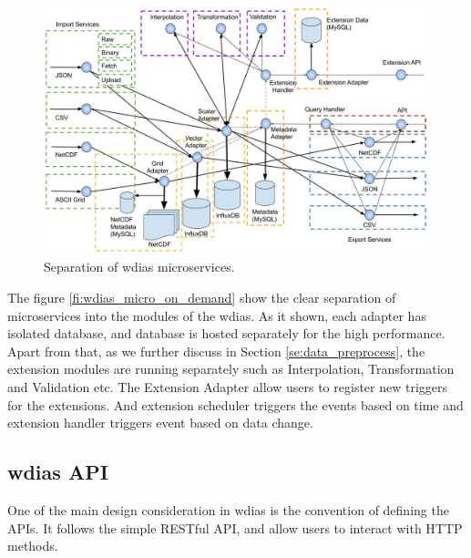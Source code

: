 \begin{figure}[htp]
    \centering
    \includegraphics[width=1\textwidth]{method/microservice/separation_microservices-v3.jpg}
    \caption{Separation of \acrshort{wdias} microservices.}
    \label{fi:wdias_micro_separation}
\end{figure}
The figure \ref{fi:wdias_micro_on_demand} show the clear separation of microservices into the modules of the \acrshort{wdias}. As it shown, each adapter has isolated database, and database is hosted separately for the high performance.
Apart from that, as we further discuss in Section \ref{se:data_preprocess}, the extension modules are running separately such as Interpolation, Transformation and Validation etc.
The Extension Adapter allow users to register new triggers for the extensions. And extension scheduler triggers the events based on time and extension handler triggers event based on data change.


\subsection{\acrshort{wdias} API}
\label{sebse:wdias_api}
One of the main design consideration in \acrshort{wdias} is the convention of defining the APIs. It follows the simple RESTful API, and allow users to interact with HTTP methods.

